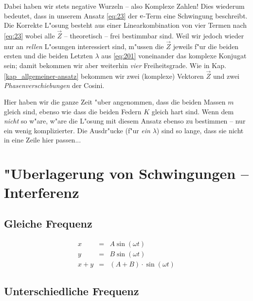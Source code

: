 Dabei haben wir stets negative Wurzeln -- also Komplexe Zahlen! Dies
wiederum bedeutet, dass in unserem Ansatz \eqref{eq:23} der $\operatorname{e}$-Term
eine Schwingung beschreibt. Die Korrekte L"osung besteht aus einer
Linearkombination von vier Termen nach \eqref{eq:23} wobei alle $\vec
Z$ -- theoretisch -- frei bestimmbar sind. Weil wir jedoch wieder nur
an \emph{rellen} L"osungen interessiert sind, m"ussen die $\vec Z$
jeweils f"ur die beiden ersten und die beiden Letzten $\lambda$ aus
\eqref{eq:201} voneinander das komplexe Konjugat sein; damit bekommen
wir aber weiterhin \emph{vier} Freiheitsgrade. Wie in
Kap. \ref{kap_allgemeiner-ansatz} bekommen wir zwei (komplexe)
Vektoren $\vec Z$ und zwei \emph{Phasenverschiebungen} der Cosini.

Hier haben wir die ganze Zeit "uber angenommen, dass die beiden Massen
$m$ gleich sind, ebenso wie dass die beiden Federn $K$ gleich hart
sind. Wenn dem \emph{nicht} so w"are, w"are die L"osung mit diesem Ansatz
ebenso zu bestimmen -- nur ein wenig komplizierter. Die Ausdr"ucke (f"ur
\emph{ein} $\lambda$) sind so lange, dass sie nicht in eine Zeile hier
passen...
















\section{"Uberlagerung von Schwingungen -- Interferenz}
\label{kap_uberlagerung-con-schwingungen-interferenz}

\subsection{Gleiche Frequenz}
\label{kap_gleiche-frequenz}

\begin{eqnarray}
\nonumber
   x &=& A \sin (\omega t)\\
\nonumber
   y &=& B \sin (\omega t)\\
   \label{eq:145}
   x+y &=& (A+B) \cdot \sin (\omega t)
\end{eqnarray}

\subsection{Unterschiedliche Frequenz}
\label{kap_unterschiedliche-frequenz}

